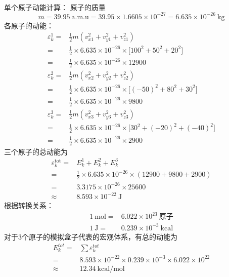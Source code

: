     \\
    单个原子动能计算：
    原子的质量
    \begin{displaymath}
	    m=39.95~\mathrm{a.m.u}=39.95\times1.6605\times10^{-27}=6.635\times10^{-26}~\mathrm{kg}    
    \end{displaymath}
    各原子的动能：
    \begin{displaymath}
	    \begin{aligned}
		    \varepsilon_k^1=&\frac12m(v_{x1}^2+v_{y1}^2+v_{z1}^2)\\
		    =&\frac12\times6.635\times10^{-26}\times\big[100^2+50^2+20^2\big]\\
		    =&\frac12\times6.635\times10^{-26}\times12900\\
		    \varepsilon_k^2=&\frac12m(v_{x2}^2+v_{y2}^2+v_{z2}^2)\\
		    =&\frac12\times6.635\times10^{-26}\times\big[(-50)^2+80^2+30^2\big]\\
		    =&\frac12\times6.635\times10^{-26}\times9800\\
		    \varepsilon_k^3=&\frac12m(v_{x3}^2+v_{y3}^2+v_{z3}^2)\\
		    =&\frac12\times6.635\times10^{-26}\times\big[30^2+(-20)^2+(-40)^2\big]\\
		    =&\frac12\times6.635\times10^{-26}\times2900
	    \end{aligned}
    \end{displaymath}
   三个原子的总动能为
   \begin{displaymath}
	   \begin{aligned}
		   \varepsilon_k^{\mathrm{tot}}=&E_k^1+E_k^2+E_k^3\\
		   =&\frac12\times6.635\times10^{-26}\times(12900+9800+2900)\\
		   =&3.3175\times10^{-26}\times25600\\
		   \approx&8.593\times10^{-22}~\mathrm{J}
	   \end{aligned}
   \end{displaymath}
   根据转换关系：
   \begin{displaymath}
	   \begin{aligned}
		   1~\mathrm{mol}=&6.022\times10^{23}~\mbox{原子}\\
		   1~\mathrm{J}=&0.239\times10^{-3}~\mathrm{kcal}
	   \end{aligned}
   \end{displaymath}
   对于3个原子的模拟盒子代表的宏观体系，有总的动能为
   \begin{displaymath}
	   \begin{aligned}
	   E_k^{tot}=&\sum\varepsilon_k^{tot}\\
	   =&8.593\times10^{-22}\times0.239\times10^{-3}\times6.022\times10^{22}\\
	   \approx&12.34~\mathrm{kcal/mol}
	   \end{aligned}
   \end{displaymath}
